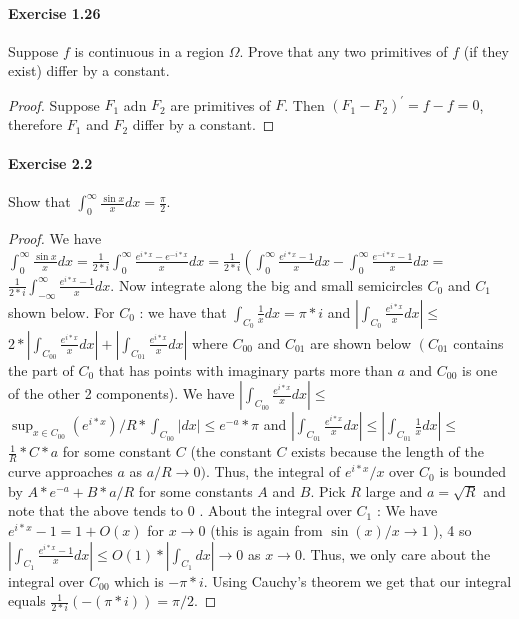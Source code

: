 \documentclass{article}
\begin{document}
\paragraph{Exercise 1.26} Suppose $f$ is continuous in a region $\Omega$. Prove that any two primitives of $f$ (if they exist) differ by a constant.
\begin{proof}
    Suppose $F_1$ adn $F_2$ are primitives of $F$. Then $(F_1-F_2)^\prime = f - f = 0$, therefore $F_1$ and $F_2$ differ by a constant. 
\end{proof}



\paragraph{Exercise 2.2} Show that $\int_{0}^{\infty} \frac{\sin x}{x} d x=\frac{\pi}{2}$.
\begin{proof}
    We have $\int_0^{\infty} \frac{\sin x}{x} d x=\frac{1}{2 * i} \int_0^{\infty} \frac{e^{i * x}-e^{-i * x}}{x} d x=\frac{1}{2 * i}\left(\int_0^{\infty} \frac{e^{i * x}-1}{x} d x-\int_0^{\infty} \frac{e^{-i * x}-1}{x} d x=\right.$ $\frac{1}{2 * i} \int_{-\infty}^{\infty} \frac{e^{i * x}-1}{x} d x$. Now integrate along the big and small semicircles $C_0$ and $C_1$ shown below. For $C_0$ : we have that $\int_{C_0} \frac{1}{x} d x=\pi * i$ and $\left|\int_{C_0} \frac{e^{i * x}}{x} d x\right| \leq$ $2 *\left|\int_{C_{00}} \frac{e^{i * x}}{x} d x\right|+\left|\int_{C_{01}} \frac{e^{i * x}}{x} d x\right|$ where $C_{00}$ and $C_{01}$ are shown below $\left(C_{01}\right.$ contains the part of $C_0$ that has points with imaginary parts more than $a$ and $C_{00}$ is one of the other 2 components). We have $\left|\int_{C_{00}} \frac{e^{i * x}}{x} d x\right| \leq$ $\sup _{x \in C_{00}}\left(e^{i * x}\right) / R * \int_{C_{00}}|d x| \leq e^{-a} * \pi$ and $\left|\int_{C_{01}} \frac{e^{i * x}}{x} d x\right| \leq\left|\int_{C_{01}} \frac{1}{x} d x\right| \leq$ $\frac{1}{R} * C * a$ for some constant $C$ (the constant $C$ exists because the length of the curve approaches $a$ as $a / R \rightarrow 0)$. Thus, the integral of $e^{i * x} / x$ over $C_0$ is bounded by $A * e^{-a}+B * a / R$ for some constants $A$ and $B$. Pick $R$ large and $a=\sqrt{R}$ and note that the above tends to 0 . About the integral over $C_1$ : We have $e^{i * x}-1=1+O(x)$ for $x \rightarrow 0$ (this is again from $\sin (x) / x \rightarrow 1$ ),
4
so $\left|\int_{C_1} \frac{e^{i * x}-1}{x} d x\right| \leq O(1) *\left|\int_{C_1} d x\right| \rightarrow 0$ as $x \rightarrow 0$. Thus, we only care about the integral over $C_{00}$ which is $-\pi * i$. Using Cauchy's theorem we get that our integral equals $\frac{1}{2 * i}(-(\pi * i))=\pi / 2$.
\end{proof}
\end{document}
